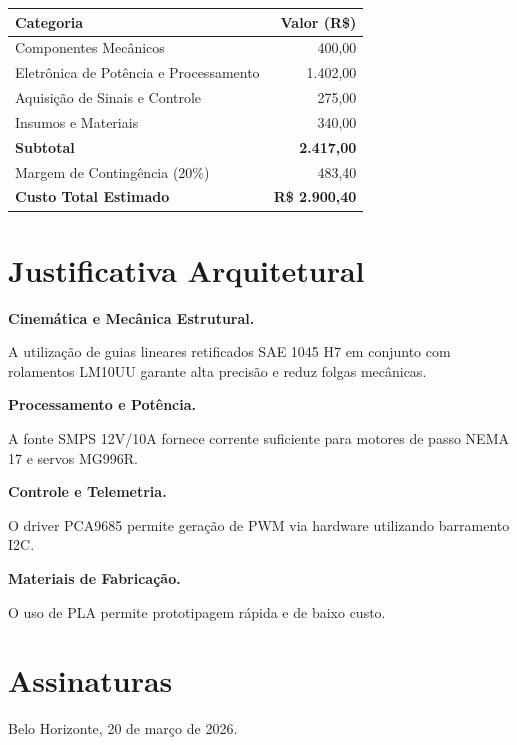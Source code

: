 \documentclass[12pt]{article}
\begin{document}
\begin{center}
\small
\begin{tabularx}{0.7\textwidth}{Y r}

\toprule
Categoria & Valor (R\$) \\
\midrule

Componentes Mecânicos & 400,00 \\
Eletrônica de Potência e Processamento & 1.402,00 \\
Aquisição de Sinais e Controle & 275,00 \\
Insumos e Materiais & 340,00 \\

\midrule
\textbf{Subtotal} & \textbf{2.417,00} \\
Margem de Contingência (20\%) & 483,40 \\

\midrule
\textbf{Custo Total Estimado} & \textbf{R\$ 2.900,40} \\

\bottomrule

\end{tabularx}
\end{center}

\section{Justificativa Arquitetural}

\textbf{Cinemática e Mecânica Estrutural.}

A utilização de guias lineares retificados SAE 1045 H7 em conjunto com rolamentos LM10UU garante alta precisão e reduz folgas mecânicas.

\textbf{Processamento e Potência.}

A fonte SMPS 12V/10A fornece corrente suficiente para motores de passo NEMA 17 e servos MG996R.

\textbf{Controle e Telemetria.}

O driver PCA9685 permite geração de PWM via hardware utilizando barramento I2C.

\textbf{Materiais de Fabricação.}

O uso de PLA permite prototipagem rápida e de baixo custo.
\section*{Assinaturas}

\begin{flushright}
Belo Horizonte, 20 de março de 2026.
\end{flushright}
\end{document}
